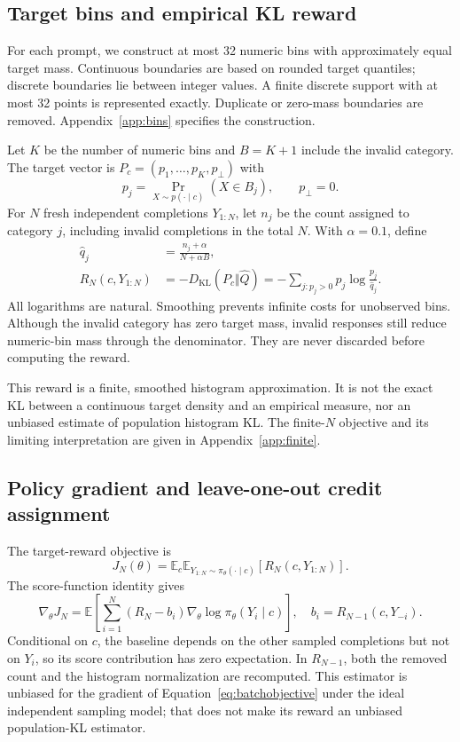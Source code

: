 \documentclass[11pt,letterpaper]{article}
\newcommand{\E}{\mathbb{E}}
\newcommand{\KL}{D_{\mathrm{KL}}}
\begin{document}
\subsection{Target bins and empirical KL reward}
For each prompt, we construct at most 32 numeric bins with approximately equal
target mass. Continuous boundaries are based on rounded target quantiles;
discrete boundaries lie between integer values. A finite discrete support
with at most 32 points is represented exactly. Duplicate or zero-mass
boundaries are removed. Appendix~\ref{app:bins} specifies the construction.

Let $K$ be the number of numeric bins and $B=K+1$ include the invalid category.
The target vector is $P_c=(p_1,\ldots,p_K,p_\bot)$ with
\begin{equation}
 p_j=\Pr_{X\sim p(\cdot\mid c)}(X\in B_j),\qquad p_\bot=0.
\end{equation}
For $N$ fresh independent completions $Y_{1:N}$, let $n_j$ be the count assigned
to category $j$, including invalid completions in the total $N$. With
$\alpha=0.1$, define
\begin{align}
 \widehat q_j&=\frac{n_j+\alpha}{N+\alpha B},\\
 R_N(c,Y_{1:N})&=-\KL(P_c\Vert\widehat Q)
 =-\sum_{j:p_j>0}p_j\log\frac{p_j}{\widehat q_j}.
 \label{eq:reward}
\end{align}
All logarithms are natural. Smoothing prevents infinite costs for unobserved
bins. Although the invalid category has zero target mass, invalid responses
still reduce numeric-bin mass through the denominator. They are never
discarded before computing the reward.

This reward is a finite, smoothed histogram approximation. It is not the exact
KL between a continuous target density and an empirical measure, nor an
unbiased estimate of population histogram KL. The finite-$N$ objective and
its limiting interpretation are given in Appendix~\ref{app:finite}.

\subsection{Policy gradient and leave-one-out credit assignment}
The target-reward objective is
\begin{equation}
 J_N(\theta)=\E_{c}\E_{Y_{1:N}\sim\pi_\theta(\cdot\mid c)}
 [R_N(c,Y_{1:N})].
 \label{eq:batchobjective}
\end{equation}
The score-function identity gives
\begin{equation}
 \nabla_\theta J_N=
 \E\!\left[\sum_{i=1}^N(R_N-b_i)
             \nabla_\theta\log\pi_\theta(Y_i\mid c)\right],
 \quad b_i=R_{N-1}(c,Y_{-i}).
 \label{eq:groupgradient}
\end{equation}
Conditional on $c$, the baseline depends on the other sampled completions
but not on $Y_i$, so its score contribution has zero expectation. In
$R_{N-1}$, both the removed count and the histogram normalization are
recomputed. This estimator is unbiased for the gradient of
Equation~\eqref{eq:batchobjective} under the ideal independent sampling model;
that does not make its reward an unbiased population-KL estimator.
\end{document}

